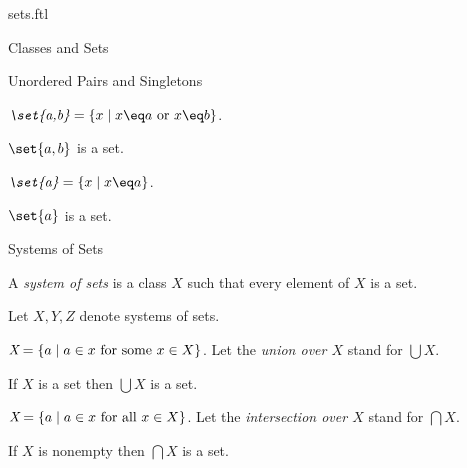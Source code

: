 \documentclass{naproche-library}
\begin{document}
\begin{smodule}{sets.ftl}
\begin{sfragment}{Classes and Sets}
  \begin{sfragment}{Unordered Pairs and Singletons}
    \begin{definition*}[forthel,id=UnorderedPairDef]
      $\emph{\set{a,b}}=\{x\mid x\eq a\text{ or }x\eq b\}$.
    \end{definition*}

    \begin{axiom*}[forthel,title=Pairing Axiom,id=UnorderedPairAx]
      $\set{a,b}$ is a set.
    \end{axiom*}

    \begin{definition*}[forthel,id=SingletonDef]
      $\emph{\set{a}}=\{x\mid x\eq a\}$.
    \end{definition*}

    \begin{proposition*}[forthel,id=SingletonProp]
      $\set{a}$ is a set.
    \end{proposition*}
  \end{sfragment}

  \begin{sfragment}{Systems of Sets}
    \begin{definition*}[forthel,id=SystemOfSetsDef]
      A \emph{system of sets} is a class $X$ such that every element of $X$ is a set.
    \end{definition*}

    \begin{forthel}
      Let $X,Y,Z$ denote systems of sets.
    \end{forthel}

    \begin{definition*}[forthel,id=BigUnionDef]
      $\emph{\bigcup X}=\{a\mid a\in x\text{ for some  }x\in X\}$.
      Let the \emph{union over $X$} stand for $\bigcup X$.
    \end{definition*}

    \begin{axiom*}[forthel,title=Union Axiom,id=BigUnionAx]
      If $X$ is a set then $\bigcup X$ is a set.
    \end{axiom*}

    \begin{definition*}[forthel,id=BigIntersectionDef]
      $\emph{\bigcap X}=\{a\mid a\in x\text{ for all }x\in X\}$.
      Let the \emph{intersection over $X$} stand for $\bigcap X$.
    \end{definition*}

    \begin{proposition*}[forthel,id=BigIntersectionProp]
      If $X$ is nonempty then $\bigcap X$ is a set.
    \end{proposition*}
  \end{sfragment}


\end{sfragment}
\end{smodule}
\end{document}
